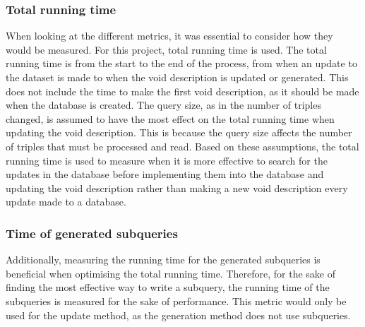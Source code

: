 
\subsubsection{Total running time}
When looking at the different metrics, it was essential to consider how they would be measured. For this project, total running time is used. The total running time is from the start to the end of the process, from when an update to the dataset is made to when the \gls{void} description is updated or generated. This does not include the time to make the first \gls{void} description, as it should be made when the database is created. The query size, as in the number of triples changed, is assumed to have the most effect on the total running time when updating the \gls{void} description. This is because the query size affects the number of triples that must be processed and read. Based on these assumptions, the total running time is used to measure when it is more effective to search for the updates in the database before implementing them into the database and updating the \gls{void} description rather than making a new \gls{void} description every update made to a database.

\subsubsection{Time of generated subqueries}
Additionally, measuring the running time for the generated subqueries is beneficial when optimising the total running time. Therefore, for the sake of finding the most effective way to write a subquery, the running time of the subqueries is measured for the sake of performance.
This metric would only be used for the update method, as the generation method does not use subqueries.

